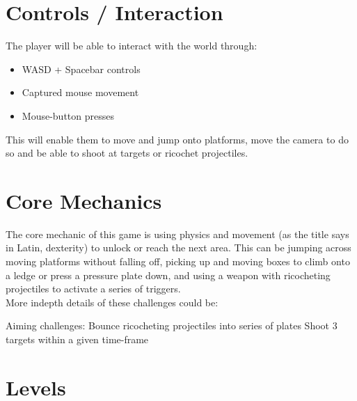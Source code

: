 \documentclass[11pt]{article}
\begin{document}
\section*{Controls / Interaction}
The player will be able to interact with the world through:
\begin{itemize}
	\item WASD + Spacebar controls 
	\item Captured mouse movement
	\item Mouse-button presses \\
\end{itemize}

This will enable them to move and jump onto platforms, move the camera to do so and be able to shoot at targets or ricochet projectiles.

\section{Core Mechanics}

The core mechanic of this game is using physics and movement (as the title says in Latin, dexterity) to unlock or reach the next area. This can be jumping across moving platforms without falling off, picking up and moving boxes to climb onto a ledge or press a pressure plate down, and using a weapon with ricocheting projectiles to activate a series of triggers. \\

More indepth details of these challenges could be:

Aiming challenges:
Bounce ricocheting projectiles into series of plates
Shoot 3 targets within a given time-frame






\section{Levels}
\end{document}
